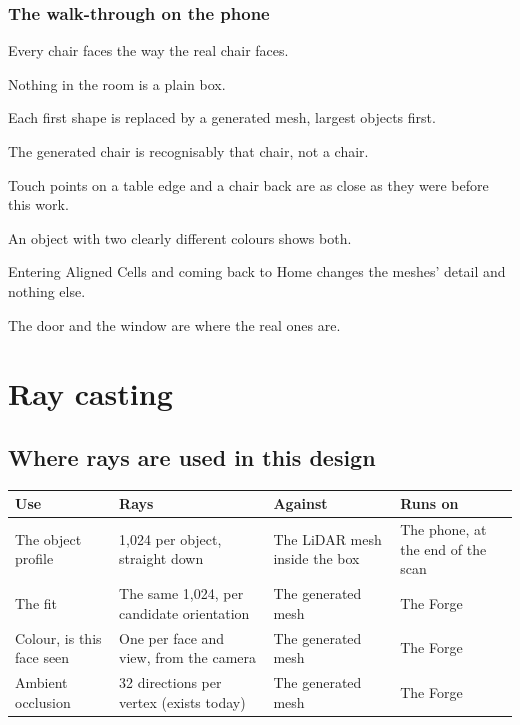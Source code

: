 \documentclass[10pt]{article}
\newcommand{\hd}[1]{\textbf{#1}}
\begin{document}
\subsubsection{The walk-through on the phone}
\begin{ticks}
\item Every chair faces the way the real chair faces.
\item Nothing in the room is a plain box.
\item Each first shape is replaced by a generated mesh, largest objects first.
\item The generated chair is recognisably that chair, not a chair.
\item Touch points on a table edge and a chair back are as close as they were before this work.
\item An object with two clearly different colours shows both.
\item Entering Aligned Cells and coming back to Home changes the meshes' detail and nothing else.
\item The door and the window are where the real ones are.
\end{ticks}

\section{Ray casting}

\subsection{Where rays are used in this design}

{\small
\begin{longtable}{@{}L{40mm}L{52mm}L{44mm}L{33mm}@{}}
\toprule
\hd{Use} & \hd{Rays} & \hd{Against} & \hd{Runs on}\\
\midrule
\endhead
The object profile & 1,024 per object, straight down & The LiDAR mesh inside the box & The phone, at the end of the scan\\
The fit & The same 1,024, per candidate orientation & The generated mesh & The Forge\\
Colour, is this face seen & One per face and view, from the camera & The generated mesh & The Forge\\
Ambient occlusion & 32 directions per vertex (exists today) & The generated mesh & The Forge\\
\bottomrule
\end{longtable}}
\end{document}
